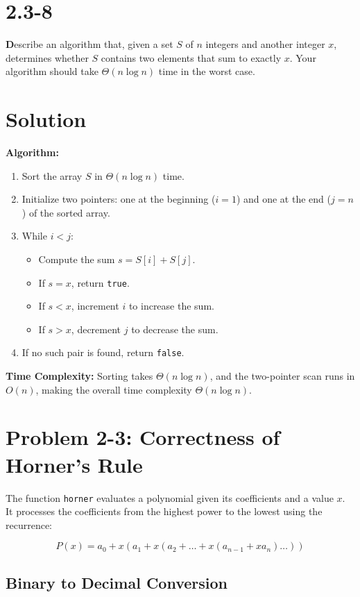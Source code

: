 \documentclass{article}
\begin{document}
\section*{2.3-8}

\textbf Describe an algorithm that, given a set $S$ of $n$ integers and another integer $x$, determines whether $S$ contains two elements that sum to exactly $x$. Your algorithm should take $\Theta(n \log n)$ time in the worst case.

\section*{Solution}

\textbf{Algorithm:}
\begin{enumerate}
    \item Sort the array $S$ in $\Theta(n \log n)$ time.
    \item Initialize two pointers: one at the beginning ($i = 1$) and one at the end ($j = n$) of the sorted array.
    \item While $i < j$:
    \begin{itemize}
        \item Compute the sum $s = S[i] + S[j]$.
        \item If $s = x$, return \texttt{true}.
        \item If $s < x$, increment $i$ to increase the sum.
        \item If $s > x$, decrement $j$ to decrease the sum.
    \end{itemize}
    \item If no such pair is found, return \texttt{false}.
\end{enumerate}

\textbf{Time Complexity:} Sorting takes $\Theta(n \log n)$, and the two-pointer scan runs in $O(n)$, making the overall time complexity $\Theta(n \log n)$.

\section*{Problem 2-3: Correctness of Horner's Rule}

The function \texttt{horner} evaluates a polynomial given its coefficients and a value $x$. It processes the coefficients from the highest power to the lowest using the recurrence:

\[
P(x) = a_0 + x(a_1 + x(a_2 + \ldots + x(a_{n-1} + x a_n) \ldots))
\]

\subsection*{Binary to Decimal Conversion}
\end{document}
